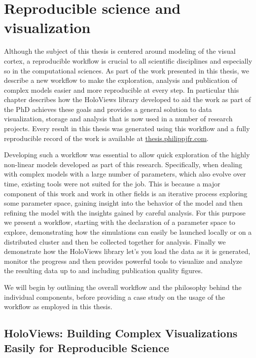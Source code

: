 \chapter{Reproducible science and visualization}

Although the subject of this thesis is centered around modeling of the
visual cortex, a reproducible workflow is crucial to all scientific
disciplines and especially so in the computational sciences. As part
of the work presented in this thesis, we describe a new workflow to
make the exploration, analysis and publication of complex models
easier and more reproducible at every step. In particular this chapter
describes how the HoloViews library developed to aid the work as part
of the PhD achieves these goals and provides a general solution to
data visualization, storage and analysis that is now used in a number
of research projects. Every result in this thesis was generated using
this workflow and a fully reproducible record of the work is available
at \url{thesis.philippjfr.com}.

Developing such a workflow was essential to allow quick exploration of
the highly non-linear models developed as part of this
research. Specifically, when dealing with complex models with a large
number of parameters, which also evolve over time, existing tools were
not suited for the job. This is because a major component of this work
and work in other fields is an iterative process exploring some
parameter space, gaining insight into the behavior of the model and
then refining the model with the insights gained by careful
analysis. For this purpose we present a workflow, starting with the
declaration of a parameter space to explore, demonstrating how the
simulations can easily be launched locally or on a distributed cluster
and then be collected together for analysis. Finally we demonstrate
how the HoloViews library let's you load the data as it is generated,
monitor the progress and then provides powerful tools to visualize and
analyze the resulting data up to and including publication quality
figures.

We will begin by outlining the overall workflow and the philosophy
behind the individual components, before providing a case study on
the usage of the workflow as employed in this thesis.

\section{HoloViews: Building Complex Visualizations Easily for Reproducible Science}

